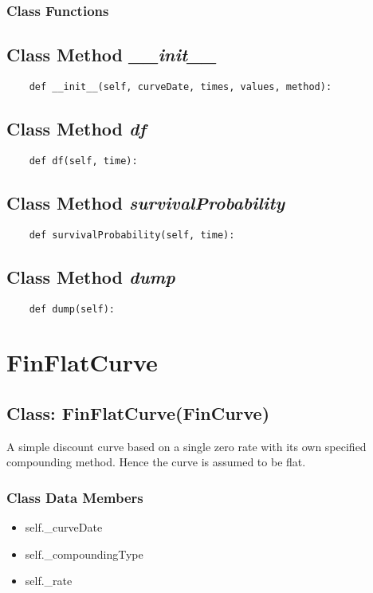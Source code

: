 \documentclass[twoside,11pt]{book}
\begin{document}
\subsubsection{Class Functions}

\subsection{Class Method {\it \_\_init\_\_}}


\begin{lstlisting}
    def __init__(self, curveDate, times, values, method):
\end{lstlisting}

\subsection{Class Method {\it df}}


\begin{lstlisting}
    def df(self, time):
\end{lstlisting}

\subsection{Class Method {\it survivalProbability}}


\begin{lstlisting}
    def survivalProbability(self, time):
\end{lstlisting}

\subsection{Class Method {\it dump}}


\begin{lstlisting}
    def dump(self):
\end{lstlisting}

\newpage
\section{FinFlatCurve}

\subsection{Class: FinFlatCurve(FinCurve)}
A simple discount curve based on a single zero rate with its own specified compounding method. Hence the curve is assumed to be flat. 

\subsubsection{Class Data Members}
\begin{itemize}
\item{self.\_curveDate}
\item{self.\_compoundingType}
\item{self.\_rate}
\end{itemize}
\end{document}
